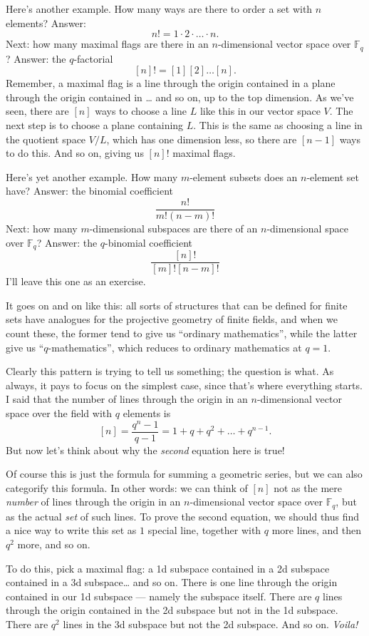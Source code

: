 \documentclass{article}
\begin{document}
Here's another example. How many ways are there to order a set with
\(n\) elements? Answer: \[n!=1\cdot2\cdot\ldots\cdot n.\] Next: how many
maximal flags are there in an \(n\)-dimensional vector space over
\(\mathbb{F}_q\)? Answer: the \(q\)-factorial
\[[n]! = [1][2]\ldots[n].\] Remember, a maximal flag is a line through
the origin contained in a plane through the origin contained in \ldots{}
and so on, up to the top dimension. As we've seen, there are \([n]\)
ways to choose a line \(L\) like this in our vector space \(V\). The
next step is to choose a plane containing \(L\). This is the same as
choosing a line in the quotient space \(V/L\), which has one dimension
less, so there are \([n-1]\) ways to do this. And so on, giving us
\([n]!\) maximal flags.

Here's yet another example. How many \(m\)-element subsets does an
\(n\)-element set have? Answer: the binomial coefficient
\[\frac{n!}{m!(n-m)!}\] Next: how many \(m\)-dimensional subspaces are
there of an \(n\)-dimensional space over \(\mathbb{F}_q\)? Answer: the
\(q\)-binomial coefficient \[\frac{[n]!}{[m]![n-m]!}\] I'll leave this
one as an exercise.

It goes on and on like this: all sorts of structures that can be defined
for finite sets have analogues for the projective geometry of finite
fields, and when we count these, the former tend to give us ``ordinary
mathematics'', while the latter give us ``\(q\)-mathematics'', which
reduces to ordinary mathematics at \(q = 1\).

Clearly this pattern is trying to tell us something; the question is
what. As always, it pays to focus on the simplest case, since that's
where everything starts. I said that the number of lines through the
origin in an \(n\)-dimensional vector space over the field with \(q\)
elements is \[[n] = \frac{q^n-1}{q-1} = 1+q+q^2+\ldots+q^{n-1}.\] But
now let's think about why the \emph{second} equation here is true!

Of course this is just the formula for summing a geometric series, but
we can also categorify this formula. In other words: we can think of
\([n]\) not as the mere \emph{number} of lines through the origin in an
\(n\)-dimensional vector space over \(\mathbb{F}_q\), but as the actual
\emph{set} of such lines. To prove the second equation, we should thus
find a nice way to write this set as \(1\) special line, together with
\(q\) more lines, and then \(q^2\) more, and so on.

To do this, pick a maximal flag: a 1d subspace contained in a 2d
subspace contained in a 3d subspace\ldots{} and so on. There is one line
through the origin contained in our 1d subspace --- namely the subspace
itself. There are \(q\) lines through the origin contained in the 2d
subspace but not in the 1d subspace. There are \(q^2\) lines in the 3d
subspace but not the 2d subspace. And so on. \emph{Voila!}
\end{document}
